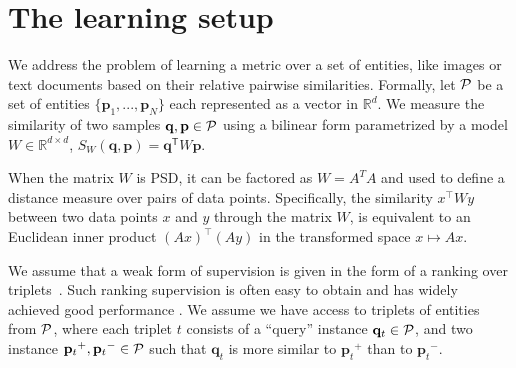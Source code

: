 \documentclass[twoside,11pt]{article}
\newcommand\mat[1]{{#1}}
\renewcommand\vec[1]{\mathbf{#1}}
\newcommand{\T}{{}^\mathsf{T}}
\newcommand{\W}{\mat{W}}
\newcommand{\Rd}{\mathbb{R}^d}
\newcommand{\ignore}[1]{}
\newcommand{\q}{{\vec{q}}}
\newcommand{\p}{{\vec{p}}}
\newcommand{\trip}{{t}}
\newcommand{\qt}{{\q_{\trip}}}
\newcommand{\pt}{{\p_{\trip}}}
\begin{document}
\ignore{
We take here an approach based on minimizing a strongly convex function using block-coordinate descent. There is a well established body of work analyzing the convergence of block-coordinate descent, e.g. \citep{nesterov2012efficiency,richtarik2014iteration}. We discuss this further in Section 5 below.
}

\section{The learning setup}
We address the problem of learning a metric over a set of
entities, like images or text documents based on their
relative pairwise similarities. Formally, let $\cal{P}$ be a set of entities $\{\p_1,...,\p_N\}$ each represented as a vector in $\Rd$. We measure the similarity of two samples $\q, \p \in \cal{P}$ using a bilinear form parametrized by a model $\W \in \mathbb{R}^{d \times d}$, $S_{\W}(\q, \p) = \q\T \W \p$.

When the matrix $\W$ is PSD, it can be factored as $\W = A^TA$ and used to define a distance measure over pairs of data points. Specifically, the similarity $x^\top\W y$ between two data points $x$ and $y$ through the matrix $\W$, is equivalent to an Euclidean inner product  $(Ax)^\top(Ay)$ in the transformed space $x \mapsto Ax$. 

We assume that a weak form of supervision is given in the form of a ranking over triplets~\citep{weinberger2006dml,OASIS,qian}. Such ranking supervision is often easy to obtain and has widely achieved good performance . We assume we have access to triplets of entities from $\cal{P}$, where each triplet $t$ consists of
a ``query'' instance $\qt \in \cal{P}$, and two instance $\pt^{+}, \pt^{-} \in \cal{P}$ such that $\qt$ is more similar to $\pt^{+}$
than to $\pt^{-}$.
\end{document}
